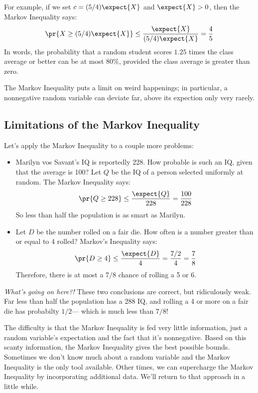 \begin{editingnotes}
For example, if we set $c = (5/4) \expect{X}$ and $\expect{X} > 0$, then the
Markov Inequality says:
%
\[
\pr{X \geq (5/4) \expect{X}} \leq
\frac{\expect{X}}{(5/4)\expect{X}} = \frac{4}{5}
\]
%
In words, the probability that a random student scores $1.25$ times
the class average or better can be at most $80\%$, provided the class
average is greater than zero.

The Markov Inequality puts a limit on weird happenings; in particular,
a nonnegative random variable can deviate far, above its expection
only very rarely.

\subsection{Limitations of the Markov Inequality}

Let's apply the Markov Inequality to a couple more problems:

\begin{itemize}

\item Marilyn vos Savant's IQ is reportedly 228.  How probable is such
an IQ, given that the average is 100?  Let $Q$ be the IQ of a person
selected uniformly at random.  The Markov Inequality says:
%
\[
\pr{Q \geq 228} \leq \frac{\expect{Q}}{228} = \frac{100}{228}
\]
%
So less than half the population is as smart as Marilyn.

\item Let $D$ be the number rolled on a fair die.  How often is a
number greater than or equal to 4 rolled?  Markov's Inequality says:
%
\[
\pr{D \geq 4} \leq \frac{\expect{D}}{4} = \frac{7/2}{4} = \frac{7}{8}
\]
%
Therefore, there is at most a $7/8$ chance of rolling a 5 or 6.

\end{itemize}

\noindent \textit{What's going on here?!}  These two conclusions are
correct, but ridiculously weak.  Far less than half the population has
a 288 IQ, and rolling a 4 or more on a fair die has probabilty
$1/2$--- which is much less than $7/8$!

The difficulty is that the Markov Inequality is fed very little
information, just a random variable's expectation and the fact that
it's nonnegative.  Based on this scanty information, the Markov
Inequality gives the best possible bounds.  Sometimes we don't know
much about a random variable and the Markov Inequality is the only
tool available.  Other times, we can supercharge the Markov Inequality
by incorporating additional data.  We'll return to that approach in a
little while.


\end{editingnotes}
